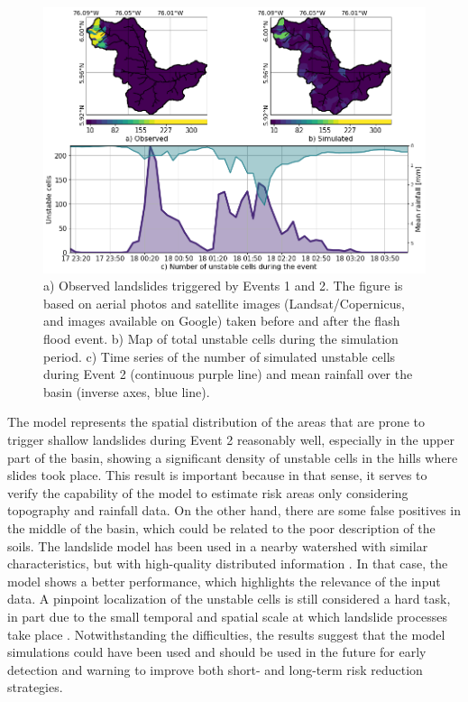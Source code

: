 \documentclass[hess, manuscript]{copernicus}
\begin{document}
\begin{figure}[t!]
\centering
 \includegraphics[width=12cm]{Figures/Slides_byHills.png}
 \caption{a) Observed landslides triggered by Events 1 and 2. The figure is based on aerial photos and satellite images (Landsat/Copernicus, and images available on Google) taken before and after the flash flood event. b) Map of total unstable cells during the simulation period. c) Time series of the number of simulated unstable cells during Event 2 (continuous purple line) and mean rainfall over the basin (inverse axes, blue line).}
    \label{fig:SlidesComparison}
\end{figure}

The model represents the spatial distribution of the areas that are prone to trigger shallow landslides during Event 2 reasonably well, especially in the upper part of the basin, showing a significant density of unstable cells in the hills where slides took place. This result is important because in that sense, it serves to verify the capability of the model to estimate risk areas only considering topography and rainfall data. On the other hand, there are some false positives in the middle of the basin, which could be related to the poor description of the soils. The landslide model has been used in a nearby watershed with similar characteristics, but with high-quality distributed information \citep{Aristizabal2016}. In that case, the model shows a better performance, which highlights the relevance of the input data. A pinpoint localization of the unstable cells is still considered a hard task, in part due to the small temporal and spatial scale at which landslide processes take place \citep{Aristizabal2016, Dhakal2004, Wu1995}. Notwithstanding the difficulties, the results suggest that the model simulations could have been used and should be used in the future for early detection and warning to improve both short- and long-term risk reduction strategies.\\
\end{document}
